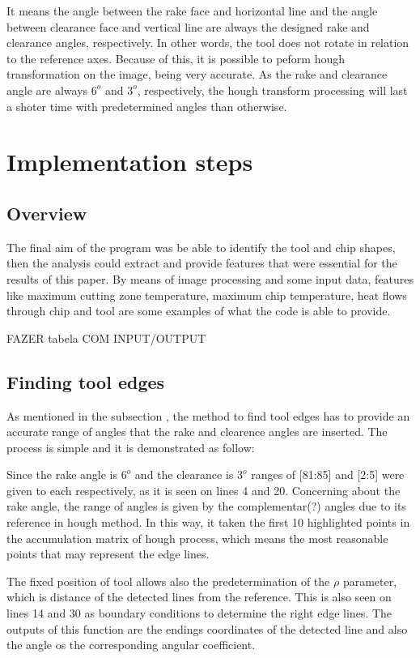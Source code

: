 	It means the angle between the rake face and horizontal line and the angle between clearance face and vertical line are always the designed rake and clearance angles, respectively. In other words, the tool does not rotate in relation to the reference axes. Because of this, it is possible to peform hough transformation on the image, being very accurate. As the rake and clearance angle are always $6^{o}$ and $3^{o}$, respectively, the hough transform processing will last a shoter time with predetermined angles than otherwise.

\section{Implementation steps}
	\subsection{Overview}	

	The final aim of the program was be able to identify the tool and chip shapes, then the analysis could extract and provide features that were essential for the results of this paper. By means of image processing and some input data, features like maximum cutting zone temperature, maximum chip temperature, heat flows through chip and tool are some examples of what the code is able to provide.	

	FAZER tabela COM INPUT/OUTPUT
	\subsection{Finding tool edges}

	As mentioned in the subsection , the method to find tool edges has to provide an accurate range of angles that the rake and clearence angles are inserted. The process is simple and it is demonstrated as follow:

	

	Since the rake angle is $6^{o}$ and the clearance is $3^{o}$ ranges of [81:85] and [2:5] were given to each respectively, as it is seen on lines 4 and 20. Concerning about the rake angle, the range of angles is given by the complementar(?) angles due to its reference in hough method. In this way, it taken the first 10 highlighted points in the accumulation matrix of hough process, which means the most reasonable points that may represent the edge lines.

	The fixed position of tool allows also the predetermination of the $\rho$ parameter, which is distance of the detected lines from the reference. This is also seen on lines 14 and 30 as boundary conditions to determine the right edge lines. The outputs of this function are the endings coordinates of the detected line and also the angle os the corresponding angular coefficient. 


